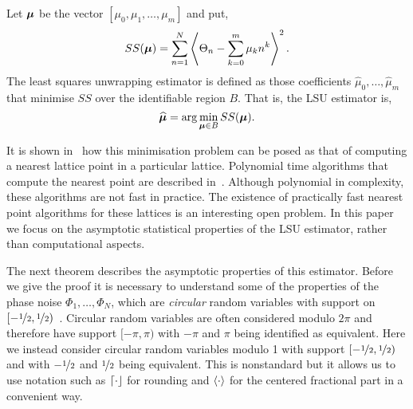 \documentclass[journal]{IEEEtran}
\begin{document}
Let $\boldsymbol{\mu}$ be the vector $[\mu_0, \mu_1, \dots, \mu_m]$ and put,
\begin{equation} \label{eq:sumofsquaresfunction}
SS(\mubf) = \sum_{n=1}^{N}\fracpart{  \Theta_{n} - \sum_{k = 0}^{m}{\mu_k n^k} }^{2}.
\end{equation}
The least squares unwrapping estimator is defined as those coefficients $\widehat{\mu}_0, \dots, \widehat{\mu}_m$ that minimise $SS$ over the identifiable region $B$. That is, the LSU estimator is,
\begin{equation}\label{eq:hatmubfLSUdefn}
\widehat{\mubf} = \arg \min_{\mubf \in B} SS(\mubf). 
\end{equation}

It is shown in~\cite[Sec~8.1]{McKilliam2010thesis}\cite{McKilliam2009asilomar_polyest_lattice} how this minimisation problem can be posed as that of computing a nearest lattice point in a particular lattice. Polynomial time algorithms that compute the nearest point are described in~\cite[Sec.~4.3]{McKilliam2010thesis}.  Although polynomial in complexity, these algorithms are not fast in practice.  The existence of practically fast nearest point algorithms for these lattices is an interesting open problem.  In this paper we focus on the asymptotic statistical properties of the LSU estimator, rather than computational aspects.

The next theorem describes the asymptotic properties of this estimator.  Before we give the proof it is necessary to understand some of the properties of the phase noise $\Phi_1,\dots,\Phi_N$, which are \emph{circular} random variables with support on $[-\nicefrac{1}{2}, \nicefrac{1}{2})$~\cite{McKilliam2010thesis,McKilliam_mean_dir_est_sq_arc_length2010,Mardia_directional_statistics,Fisher1993}.  Circular random variables are often considered modulo $2\pi$ and therefore have support $[-\pi, \pi)$ with $-\pi$ and $\pi$ being identified as equivalent.  Here we instead consider circular random variables modulo 1 with support $[-\nicefrac{1}{2}, \nicefrac{1}{2})$ and with $-\nicefrac{1}{2}$ and $\nicefrac{1}{2}$ being equivalent.  This is nonstandard but it allows us to use notation such as ${\left\lceil \cdot \right\rfloor}$ for rounding and $\left\langle \cdot \right\rangle$ for the centered fractional part in a convenient way.   %
\end{document}
